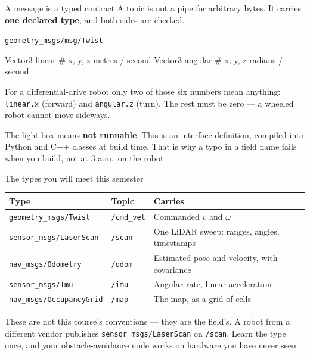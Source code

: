 \documentclass[aspectratio=169]{beamer}
\begin{document}
\begin{frame}[fragile]{A message is a typed contract}
  \small A topic is not a pipe for arbitrary bytes. It carries \textbf{one declared type},
  and both sides are checked.

  \vspace{0.3em}
  {\footnotesize\texttt{geometry\_msgs/msg/Twist}}
  \begin{spec}
Vector3  linear      # x, y, z   metres / second
Vector3  angular     # x, y, z   radians / second
  \end{spec}

  \vspace{0.4em}
  For a differential-drive robot only two of those six numbers mean anything:
  \texttt{linear.x} (forward) and \texttt{angular.z} (turn). The rest must be zero --- a
  wheeled robot cannot move sideways.

  \vspace{0.4em}
  \begin{underhood}
    \footnotesize
    The light box means \textbf{not runnable}. This is an interface definition, compiled into
    Python and C++ classes at build time. That is why a typo in a field name fails when you
    build, not at 3 a.m.\ on the robot.
  \end{underhood}
\end{frame}

\begin{frame}{The types you will meet this semester}
  \small
  \begin{center}
  \begin{tabular}{@{}p{3.9cm}p{1.7cm}p{4.6cm}@{}}
    \toprule
    \textbf{Type} & \textbf{Topic} & \textbf{Carries} \\
    \midrule
    {\footnotesize\texttt{geometry\_msgs/Twist}}    & \texttt{/cmd\_vel} & Commanded $v$ and $\omega$ \\
    {\footnotesize\texttt{sensor\_msgs/LaserScan}}  & \texttt{/scan}     & One LiDAR sweep: ranges, angles, timestamps \\
    {\footnotesize\texttt{nav\_msgs/Odometry}}      & \texttt{/odom}     & Estimated pose and velocity, with covariance \\
    {\footnotesize\texttt{sensor\_msgs/Imu}}        & \texttt{/imu}      & Angular rate, linear acceleration \\
    {\footnotesize\texttt{nav\_msgs/OccupancyGrid}} & \texttt{/map}      & The map, as a grid of cells \\
    \bottomrule
  \end{tabular}
  \end{center}

  \vspace{0.4em}
  \begin{inthefield}
    \footnotesize
    These are not this course's conventions --- they are the field's. A robot from a different
    vendor publishes \texttt{sensor\_msgs/LaserScan} on \texttt{/scan}. Learn the type once,
    and your obstacle-avoidance node works on hardware you have never seen.
  \end{inthefield}
\end{frame}
\end{document}
